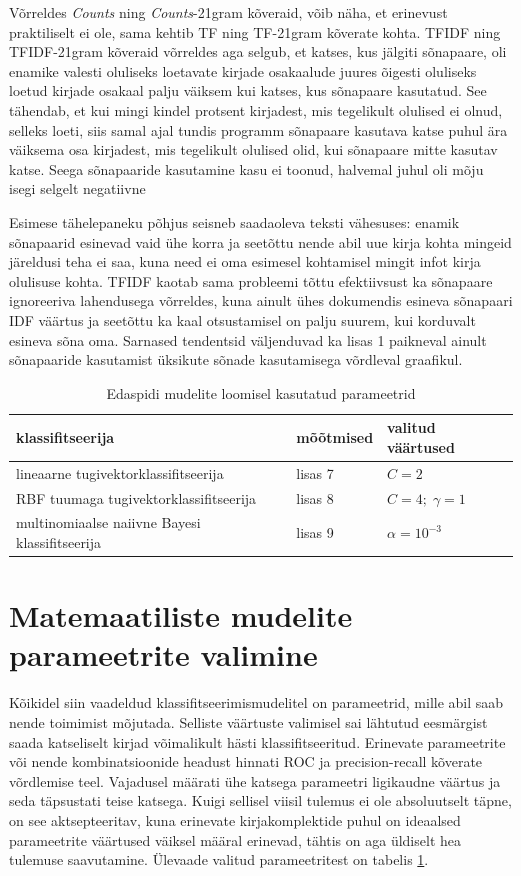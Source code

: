\documentclass[]{trkuur}
\let\eng\emph
\begin{document}
Võrreldes \eng{Counts} ning \eng{Counts}-21gram kõveraid, võib näha, et erinevust praktiliselt
ei ole, sama kehtib TF ning TF-21gram kõverate kohta. TFIDF ning TFIDF-21gram
kõveraid võrreldes aga selgub, et katses, kus jälgiti sõnapaare, oli enamike
valesti oluliseks loetavate kirjade osakaalude juures õigesti oluliseks loetud kirjade osakaal palju väiksem kui katses,
kus sõnapaare kasutatud. See tähendab, et kui mingi kindel protsent kirjadest,
mis tegelikult olulised ei olnud, selleks loeti, siis samal ajal tundis programm 
sõnapaare kasutava katse puhul ära väiksema osa kirjadest, mis tegelikult 
olulised olid, kui sõnapaare mitte kasutav katse. Seega sõnapaaride kasutamine 
kasu ei toonud, halvemal juhul oli mõju isegi selgelt negatiivne

Esimese tähelepaneku põhjus seisneb saadaoleva teksti
vähesuses: enamik sõnapaarid esinevad vaid ühe korra ja seetõttu nende abil
uue kirja kohta mingeid järeldusi teha ei saa, kuna need
ei oma esimesel kohtamisel mingit infot kirja olulisuse kohta.
TFIDF kaotab sama probleemi tõttu efektiivsust ka sõnapaare ignoreeriva
lahendusega võrreldes, kuna ainult ühes dokumendis esineva sõnapaari IDF väärtus
ja seetõttu ka kaal otsustamisel on palju suurem, kui korduvalt esineva sõna
oma.
Sarnased tendentsid väljenduvad ka lisas 1 
paikneval ainult sõnapaaride kasutamist üksikute sõnade kasutamisega võrdleval
graafikul.

\begin{table}[h!]
\caption{Edaspidi mudelite loomisel kasutatud parameetrid}
\label{paramtabel}
\begin{tabular}{| l | l | l |} \hline
klassifitseerija & mõõtmised & valitud väärtused \\ \hline
lineaarne tugivektorklassifitseerija &
    lisas 7 &
    \( C = 2 \) \\ \hline
RBF tuumaga tugivektorklassifitseerija &
    lisas 8 &
    \( C = 4;\; \gamma = 1\) \\ \hline
multinomiaalse naiivne Bayesi klassifitseerija &
    lisas 9 &
    \( \alpha = 10^{-3} \) \\ \hline
\end{tabular}
\end{table}


\section{Matemaatiliste mudelite parameetrite valimine}
Kõikidel siin vaadeldud klassifitseerimismudelitel on parameetrid, mille
abil saab nende toimimist mõjutada. Selliste väärtuste valimisel sai lähtutud
eesmärgist saada katseliselt kirjad võimalikult hästi klassifitseeritud.
Erinevate parameetrite või nende kombinatsioonide headust hinnati ROC ja
precision-recall kõverate võrdlemise teel. Vajadusel määrati ühe
katsega parameetri ligikaudne väärtus ja seda täpsustati teise katsega.
Kuigi sellisel viisil tulemus ei ole absoluutselt täpne, on see aktsepteeritav,
kuna erinevate kirjakomplektide puhul on ideaalsed parameetrite väärtused
väiksel määral erinevad, tähtis on aga üldiselt hea tulemuse saavutamine.
Ülevaade valitud parameetritest on tabelis \ref{paramtabel}.
\end{document}
